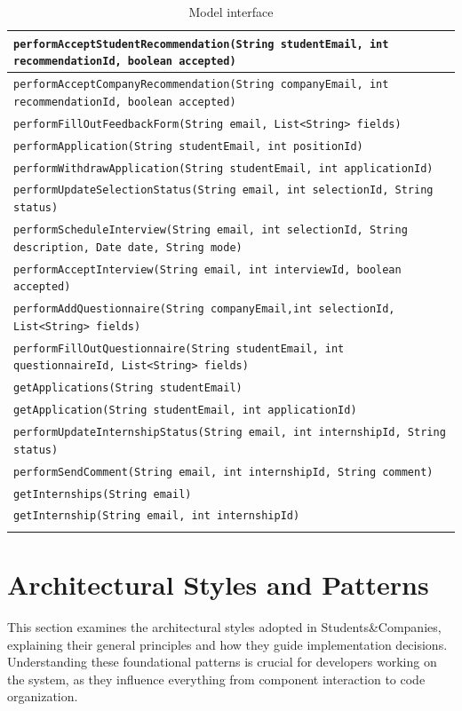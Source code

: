\begin{longtable}{|p{14.5cm}|}
    \texttt{performAcceptStudentRecommendation(String studentEmail, int recommendationId, boolean accepted)} \\ \hline
    \texttt{performAcceptCompanyRecommendation(String companyEmail, int recommendationId, boolean accepted)} \\ \hline
    \texttt{performFillOutFeedbackForm(String email, List<String> fields)} \\ \hline
    
    \texttt{performApplication(String studentEmail, int positionId)} \\ \hline
    \texttt{performWithdrawApplication(String studentEmail, int applicationId)} \\ \hline
    \texttt{performUpdateSelectionStatus(String email, int selectionId, String status)} \\ \hline
    \texttt{performScheduleInterview(String email, int selectionId, String description, Date date, String mode)} \\ \hline
    \texttt{performAcceptInterview(String email, int interviewId, boolean accepted)} \\ \hline
    \texttt{performAddQuestionnaire(String companyEmail,int selectionId, List<String> fields)} \\ \hline
    \texttt{performFillOutQuestionnaire(String studentEmail, int questionnaireId, List<String> fields)} \\ \hline
    \texttt{getApplications(String studentEmail)} \\ \hline
    \texttt{getApplication(String studentEmail, int applicationId)} \\ \hline
    
    \texttt{performUpdateInternshipStatus(String email, int internshipId, String status)} \\ \hline
    \texttt{performSendComment(String email, int internshipId, String comment)} \\ \hline
    \texttt{getInternships(String email)} \\ \hline
    \texttt{getInternship(String email, int internshipId)} \\ \hline
\caption{Model interface}
\end{longtable}

\section{Architectural Styles and Patterns}
This section examines the architectural styles adopted in Students\&Companies, explaining their general principles and how they guide implementation decisions.
Understanding these foundational patterns is crucial for developers working on the system, as they influence everything from component interaction to code organization.

